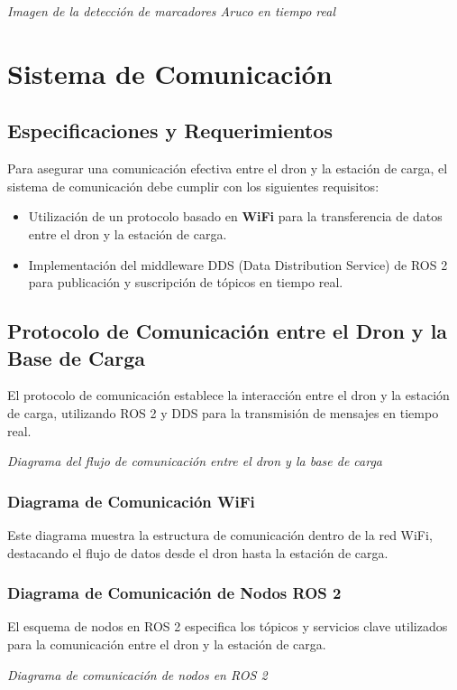     \begin{center} 
        \textit{Imagen de la detección de marcadores Aruco en tiempo real} 
    \end{center}

\section{Sistema de Comunicación}
\subsection{Especificaciones y Requerimientos} 
Para asegurar una comunicación efectiva entre el dron y la estación de carga, el sistema de comunicación debe cumplir con los siguientes requisitos:

    \begin{itemize} 
        \item Utilización de un protocolo basado en \textbf{WiFi} para la transferencia de datos entre el dron y la estación de carga. 
        \item Implementación del middleware DDS (Data Distribution Service) de ROS 2 para publicación y suscripción de tópicos en tiempo real. 
    \end{itemize}

\subsection{Protocolo de Comunicación entre el Dron y la Base de Carga} 
El protocolo de comunicación establece la interacción entre el dron y la estación de carga, utilizando ROS 2 y DDS para la transmisión de mensajes en tiempo real.

    \begin{center} 
        \textit{Diagrama del flujo de comunicación entre el dron y la base de carga} 
    \end{center}

\subsubsection{Diagrama de Comunicación WiFi} 
Este diagrama muestra la estructura de comunicación dentro de la red WiFi, destacando el flujo de datos desde el dron hasta la estación de carga.

\subsubsection{Diagrama de Comunicación de Nodos ROS 2} 
El esquema de nodos en ROS 2 especifica los tópicos y servicios clave utilizados para la comunicación entre el dron y la estación de carga.

    \begin{center} 
        \textit{Diagrama de comunicación de nodos en ROS 2} 
    \end{center}




